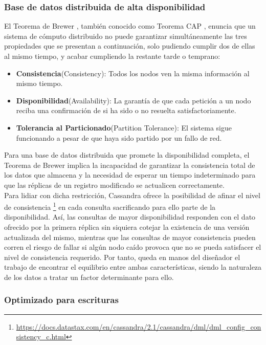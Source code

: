 \subsubsection{Base de datos distribuida de alta disponibilidad}

El Teorema de Brewer \cite{gilbert2002brewer}, también conocido como Teorema CAP , enuncia que un sistema de cómputo distribuido no puede  garantizar simultáneamente las tres propiedades que se presentan a continuación, solo pudiendo cumplir dos de ellas al mismo tiempo, y acabar cumpliendo la restante tarde o temprano:

\begin{itemize}
	\item \textbf{Consistencia}(Consistency): Todos los nodos ven la misma información al mismo tiempo.
	\item \textbf{Disponibilidad}(Availability): La garantía de que cada petición a un nodo reciba una confirmación de si ha sido o no resuelta satisfactoriamente.
	\item \textbf{Tolerancia al Particionado}(Partition Tolerance): El sistema sigue funcionando a pesar de que haya sido partido por un fallo de red.
\end{itemize}

Para una base de datos distribuida que promete la disponibilidad completa, el Teorema de Brewer implica la incapacidad de garantizar la consistencia total de los datos que almacena y la necesidad de esperar un tiempo indeterminado para que las réplicas de un registro modificado se actualicen correctamente.\\

Para lidiar con dicha restricción, Cassandra ofrece la posibilidad de afinar el nivel de consistencia \footnote{\url{https://docs.datastax.com/en/cassandra/2.1/cassandra/dml/dml_config_consistency_c.html}} en cada consulta sacrificando para ello parte de la disponibilidad. Así, las consultas de mayor disponibilidad responden con el dato ofrecido por la primera réplica sin siquiera cotejar la existencia de una versión actualizada del mismo, mientras que las consultas de mayor consistencia pueden corren el riesgo de fallar si algún nodo caído provoca que no se pueda satisfacer el nivel de consistencia requerido. Por tanto, queda en manos del diseñador el trabajo de encontrar el equilibrio entre ambas características, siendo la naturaleza de los datos a tratar un factor determinante para ello.

\subsubsection{Optimizado para escrituras}

